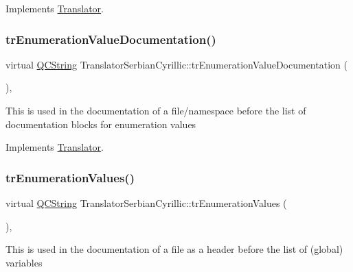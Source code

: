 Implements \mbox{\hyperlink{class_translator}{Translator}}.

\mbox{\label{class_translator_serbian_cyrillic_ab9cbf7b65ec04f3ba87b8fd75644089f}} 
\subsubsection{\texorpdfstring{trEnumerationValueDocumentation()}{trEnumerationValueDocumentation()}}
{\footnotesize\ttfamily virtual \mbox{\hyperlink{class_q_c_string}{Q\+C\+String}} Translator\+Serbian\+Cyrillic\+::tr\+Enumeration\+Value\+Documentation (\begin{DoxyParamCaption}{ }\end{DoxyParamCaption})\hspace{0.3cm}{\ttfamily [inline]}, {\ttfamily [virtual]}}

This is used in the documentation of a file/namespace before the list of documentation blocks for enumeration values 

Implements \mbox{\hyperlink{class_translator}{Translator}}.

\mbox{\label{class_translator_serbian_cyrillic_a85bb90af627cf0c401b6660fa21510ce}} 
\subsubsection{\texorpdfstring{trEnumerationValues()}{trEnumerationValues()}}
{\footnotesize\ttfamily virtual \mbox{\hyperlink{class_q_c_string}{Q\+C\+String}} Translator\+Serbian\+Cyrillic\+::tr\+Enumeration\+Values (\begin{DoxyParamCaption}{ }\end{DoxyParamCaption})\hspace{0.3cm}{\ttfamily [inline]}, {\ttfamily [virtual]}}

This is used in the documentation of a file as a header before the list of (global) variables 

